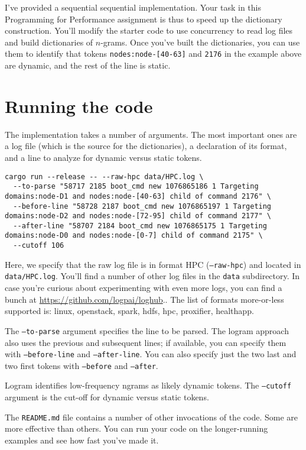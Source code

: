 \documentclass[12pt]{article}
\renewcommand{\_}{\kern-1.5pt\textunderscore\kern-1.5pt}
\begin{document}
I've provided a sequential sequential implementation. Your task in this Programming for Performance assignment is thus to speed up the dictionary construction. You'll modify the starter code to use concurrency to read log files and build dictionaries of $n$-grams. Once you've built the dictionaries, you can use them to identify that tokens \texttt{nodes:node-[40-63]} and \texttt{2176} in the example above are dynamic, and the rest of the line is static.

\section*{Running the code}
The implementation takes a number of arguments. The most important ones are a log file (which is the source for the dictionaries), a declaration of its format, and a line to analyze for dynamic versus static tokens.

{\tiny
\begin{verbatim}
cargo run --release -- --raw-hpc data/HPC.log \
  --to-parse "58717 2185 boot_cmd new 1076865186 1 Targeting domains:node-D1 and nodes:node-[40-63] child of command 2176" \
  --before-line "58728 2187 boot_cmd new 1076865197 1 Targeting domains:node-D2 and nodes:node-[72-95] child of command 2177" \
  --after-line "58707 2184 boot_cmd new 1076865175 1 Targeting domains:node-D0 and nodes:node-[0-7] child of command 2175" \
  --cutoff 106
\end{verbatim}
}

Here, we specify that the raw log file is in format HPC (\texttt{--raw-hpc}) and located in \texttt{data/HPC.log}. You'll find a number of other log files in the \texttt{data} subdirectory. In case you're curious about experimenting with even more logs, you can find a bunch at \url{https://github.com/logpai/loghub}.. The list of formats more-or-less supported is: linux, openstack, spark, hdfs, hpc, proxifier, healthapp.

The \texttt{--to-parse} argument specifies the line to be parsed. The logram approach also uses the previous and subsequent lines; if available, you can specify them with \texttt{--before-line} and \texttt{--after-line}. You can also specify just the two last and two first tokens with \texttt{--before} and \texttt{--after}.

Logram identifies low-frequency ngrams as likely dynamic tokens. The \texttt{--cutoff} argument is the cut-off for dynamic versus static tokens.

The \texttt{README.md} file contains a number of other invocations of the code. Some are more effective than others. You can run your code on the longer-running examples and see how fast you've made it.
\end{document}
